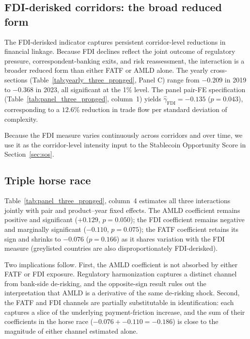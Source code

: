 \subsection{FDI-derisked corridors: the broad reduced form}
\label{subsec:fdi}

The FDI-derisked indicator captures persistent corridor-level reductions in financial linkage. Because FDI declines reflect the joint outcome of regulatory pressure, correspondent-banking exits, and risk reassessment, the interaction is a broader reduced form than either FATF or AMLD alone. The yearly cross-sections (Table~\ref{tab:yearly_three_pronged}, Panel C) range from $-0.209$ in 2019 to $-0.368$ in 2023, all significant at the 1\% level. The panel pair-FE specification (Table~\ref{tab:panel_three_pronged}, column~1) yields $\hat{\gamma}_{\text{FDI}} = -0.135$ ($p = 0.043$), corresponding to a $12.6\%$ reduction in trade flow per standard deviation of complexity.

Because the FDI measure varies continuously across corridors and over time, we use it as the corridor-level intensity input to the Stablecoin Opportunity Score in Section~\ref{sec:sos}.

\subsection{Triple horse race}
\label{subsec:horserace}

Table~\ref{tab:panel_three_pronged}, column~4 estimates all three interactions jointly with pair and product--year fixed effects. The AMLD coefficient remains positive and significant ($+0.129$, $p = 0.050$); the FDI coefficient remains negative and marginally significant ($-0.110$, $p = 0.075$); the FATF coefficient retains its sign and shrinks to $-0.076$ ($p = 0.166$) as it shares variation with the FDI measure (greylisted countries are also disproportionately FDI-derisked).

Two implications follow. First, the AMLD coefficient is not absorbed by either FATF or FDI exposure. Regulatory harmonization captures a distinct channel from bank-side de-risking, and the opposite-sign result rules out the interpretation that AMLD is a derivative of the same de-risking shock. Second, the FATF and FDI channels are partially substitutable in identification: each captures a slice of the underlying payment-friction increase, and the sum of their coefficients in the horse race ($-0.076 + -0.110 = -0.186$) is close to the magnitude of either channel estimated alone.

